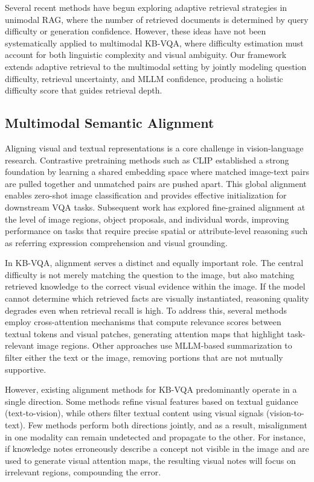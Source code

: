 \documentclass[manuscript,screen,review]{acmart}
\begin{document}
Several recent methods have begun exploring adaptive retrieval strategies in unimodal RAG, where the number of retrieved documents is determined by query difficulty or generation confidence. However, these ideas have not been systematically applied to multimodal KB-VQA, where difficulty estimation must account for both linguistic complexity and visual ambiguity. Our framework extends adaptive retrieval to the multimodal setting by jointly modeling question difficulty, retrieval uncertainty, and MLLM confidence, producing a holistic difficulty score that guides retrieval depth.

\subsection{Multimodal Semantic Alignment}

Aligning visual and textual representations is a core challenge in vision-language research. Contrastive pretraining methods such as CLIP established a strong foundation by learning a shared embedding space where matched image-text pairs are pulled together and unmatched pairs are pushed apart. This global alignment enables zero-shot image classification and provides effective initialization for downstream VQA tasks. Subsequent work has explored fine-grained alignment at the level of image regions, object proposals, and individual words, improving performance on tasks that require precise spatial or attribute-level reasoning such as referring expression comprehension and visual grounding.

In KB-VQA, alignment serves a distinct and equally important role. The central difficulty is not merely matching the question to the image, but also matching retrieved knowledge to the correct visual evidence within the image. If the model cannot determine which retrieved facts are visually instantiated, reasoning quality degrades even when retrieval recall is high. To address this, several methods employ cross-attention mechanisms that compute relevance scores between textual tokens and visual patches, generating attention maps that highlight task-relevant image regions. Other approaches use MLLM-based summarization to filter either the text or the image, removing portions that are not mutually supportive.

However, existing alignment methods for KB-VQA predominantly operate in a single direction. Some methods refine visual features based on textual guidance (text-to-vision), while others filter textual content using visual signals (vision-to-text). Few methods perform both directions jointly, and as a result, misalignment in one modality can remain undetected and propagate to the other. For instance, if knowledge notes erroneously describe a concept not visible in the image and are used to generate visual attention maps, the resulting visual notes will focus on irrelevant regions, compounding the error.
\end{document}
